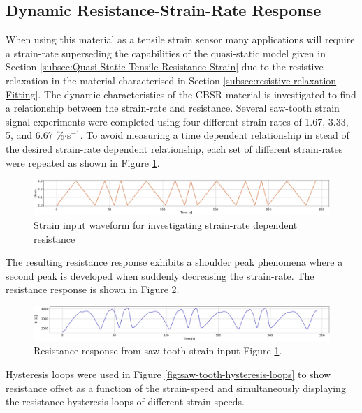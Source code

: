 \subsection{Dynamic Resistance-Strain-Rate Response}
When using this material as a tensile strain sensor many applications will require a strain-rate superseding the capabilities of the quasi-static model given in Section \ref{subsec:Quasi-Static Tensile Resistance-Strain} due to the resistive relaxation in the material characterised in Section \ref{subsec:resistive relaxation Fitting}. The dynamic characteristics of the CBSR material is investigated to find a relationship between the strain-rate and resistance. Several saw-tooth strain signal experiments were completed using four different strain-rates of 1.67, 3.33, 5, and 6.67 \%$\cdot$s$^{-1}$. To avoid measuring a time dependent relationship in stead of the desired strain-rate dependent relationship, each set of different strain-rates were repeated as shown in Figure \ref{fig:saw-tooth-diff-v}.
\begin{figure}[H]
	\centering
	\includegraphics[width=\linewidth]{Figures/saw_tooth_diff_speeds_strain_only.jpg}
	\caption{Strain input waveform for investigating strain-rate dependent resistance}
	\label{fig:saw-tooth-diff-v}
\end{figure}
The resulting resistance response exhibits a shoulder peak phenomena where a second peak is developed when suddenly decreasing the strain-rate. The resistance response is shown in Figure \ref{fig:saw-tooth-res-response}.
\begin{figure}[H]
	\centering
	\includegraphics[width=\linewidth]{Figures/saw_tooth_diff_speeds_res_only.jpg}
	\caption{Resistance response from saw-tooth strain input Figure \ref{fig:saw-tooth-diff-v}.}
	\label{fig:saw-tooth-res-response}
\end{figure}
Hysteresis loops were used in Figure \ref{fig:saw-tooth-hysteresis-loops} to show resistance offset as a function of the strain-speed and simultaneously displaying the resistance hysteresis loops of different strain speeds. 

